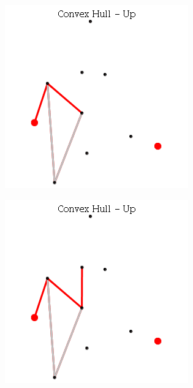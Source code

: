 \documentclass[12pt]{article}
\begin{document}
\begin{figure}[h]
\begin{subfigure}[h]{0.3\linewidth}
              \caption{}
            \end{subfigure}
            \begin{subfigure}[h]{0.3\linewidth}
              \includegraphics[width=\linewidth]{GIF/Up-6}
              \caption{}
            \end{subfigure}
            \begin{subfigure}[h]{0.3\linewidth}
              \includegraphics[width=\linewidth]{GIF/Up-7}

\end{subfigure}
\end{figure}
\end{document}
